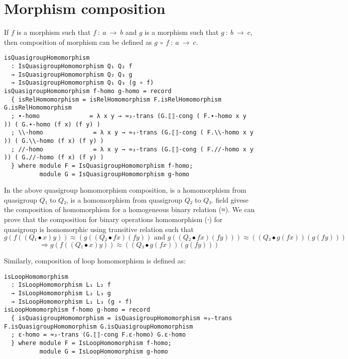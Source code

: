 \section{Morphism composition}
If $f$ is a morphism such that $f\ :\ a \ \rightarrow \ b$ and $g$ is a morphism
such that $g\ :\ b\ \rightarrow \ c$, then composition of morphism can be
defined as $g \ ∘\ f\ :\ a \ \rightarrow \ c$. 
\begin{verbatim}
isQuasigroupHomomorphism
  : IsQuasigroupHomomorphism Q₁ Q₂ f
  → IsQuasigroupHomomorphism Q₂ Q₃ g
  → IsQuasigroupHomomorphism Q₁ Q₃ (g ∘ f)
isQuasigroupHomomorphism f-homo g-homo = record
  { isRelHomomorphism = isRelHomomorphism F.isRelHomomorphism G.isRelHomomorphism
  ; ∙-homo              = λ x y → ≈₃-trans (G.⟦⟧-cong ( F.∙-homo x y )) ( G.∙-homo (f x) (f y) )
  ; \\-homo              = λ x y → ≈₃-trans (G.⟦⟧-cong ( F.\\-homo x y )) ( G.\\-homo (f x) (f y) )
  ; //-homo              = λ x y → ≈₃-trans (G.⟦⟧-cong ( F.//-homo x y )) ( G.//-homo (f x) (f y) )
  } where module F = IsQuasigroupHomomorphism f-homo; 
          module G = IsQuasigroupHomomorphism g-homo
\end{verbatim}
In the above quasigroup homomorphism composition,  is a homomorphism
from quasigroup $Q₁$ to $Q₂$,  is a homomorphism from quasigroup $Q₂$ to $Q₃$.
 field givese the composition of homomorphism for a
homogeneous binary relation (≈). We can prove that the composition for binary
operations homomorphism (∙) for quasigroup is homomorphic using transitive
relation  such that \[g (f ((Q₁ ∙ x) y)) ≈ (g ((Q₂ ∙ f x) (f
y)) \text{ and } g ((Q₂ ∙ f x) (f y))) ≈ ((Q₃ ∙ g (f x)) (g (f y)))\]
\[\Rightarrow g (f ((Q₁ ∙ x) y)) ≈ ((Q₃ ∙ g (f x)) (g (f y)))\]

Similarly, composition of loop homomorphism is defined as:
\begin{verbatim}
isLoopHomomorphism
  : IsLoopHomomorphism L₁ L₂ f
  → IsLoopHomomorphism L₂ L₃ g
  → IsLoopHomomorphism L₁ L₃ (g ∘ f)
isLoopHomomorphism f-homo g-homo = record
  { isQuasigroupHomomorphism = isQuasigroupHomomorphism ≈₃-trans F.isQuasigroupHomomorphism G.isQuasigroupHomomorphism
  ; ε-homo = ≈₃-trans (G.⟦⟧-cong F.ε-homo) G.ε-homo
  } where module F = IsLoopHomomorphism f-homo; 
          module G = IsLoopHomomorphism g-homo
\end{verbatim}

